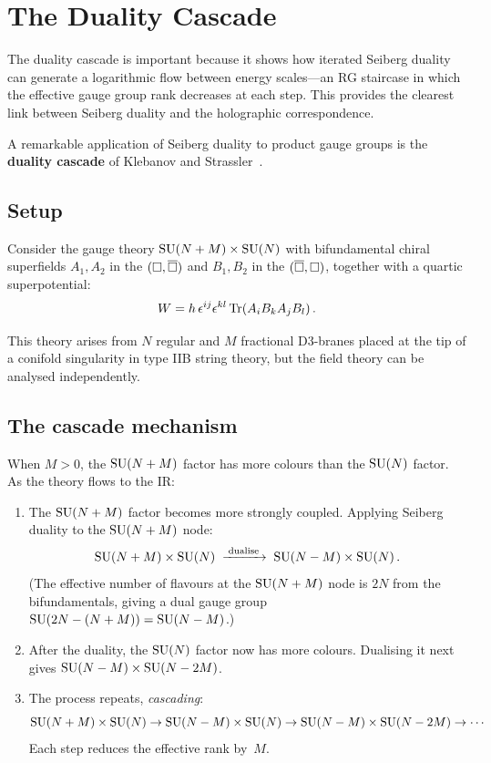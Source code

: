 \documentclass[11pt,a4paper]{article}
\begin{document}
\section{The Duality Cascade}
\label{sec:cascade}

The duality cascade is important because it shows how iterated Seiberg
duality can generate a logarithmic flow between energy scales---an RG
staircase in which the effective gauge group rank decreases at each
step.  This provides the clearest link between Seiberg duality and
the holographic correspondence.

A remarkable application of Seiberg duality to product gauge groups
is the \textbf{duality cascade} of Klebanov and
Strassler~\cite{KlebanovStrassler2000}.

\subsection{Setup}

Consider the gauge theory $\mathrm{SU}(N+M) \times \mathrm{SU}(N)$ with
bifundamental chiral superfields $A_1, A_2$ in the
$(\square, \overline{\square})$ and $B_1, B_2$ in the $(\overline{\square}, \square)$,
together with a quartic superpotential:
\[
  W = h\,\epsilon^{ij}\epsilon^{kl}\,
  \mathrm{Tr}(A_i B_k A_j B_l)\,.
\]

This theory arises from $N$ regular and $M$ fractional D3-branes
placed at the tip of a conifold singularity in type IIB string
theory, but the field theory can be analysed independently.

\subsection{The cascade mechanism}

When $M > 0$, the $\mathrm{SU}(N+M)$ factor has more colours than the
$\mathrm{SU}(N)$ factor.  As the theory flows to the IR:
\begin{enumerate}
  \item The $\mathrm{SU}(N+M)$ factor becomes more strongly coupled.
    Applying Seiberg duality to the $\mathrm{SU}(N+M)$ node:
    \[
      \mathrm{SU}(N+M) \times \mathrm{SU}(N)
      \;\xrightarrow{\;\text{dualise}\;}
      \;\mathrm{SU}(N-M) \times \mathrm{SU}(N)\,.
    \]
    (The effective number of flavours at the $\mathrm{SU}(N+M)$ node is
    $2N$ from the bifundamentals, giving a dual gauge group
    $\mathrm{SU}(2N - (N+M)) = \mathrm{SU}(N-M)$.)
  \item After the duality, the $\mathrm{SU}(N)$ factor now has more
    colours.  Dualising it next gives
    $\mathrm{SU}(N-M) \times \mathrm{SU}(N-2M)$.
  \item The process repeats, \emph{cascading}:
    \[
      \mathrm{SU}(N+M) \times \mathrm{SU}(N)
      \to \mathrm{SU}(N-M) \times \mathrm{SU}(N)
      \to \mathrm{SU}(N-M) \times \mathrm{SU}(N-2M)
      \to \cdots
    \]
    Each step reduces the effective rank by~$M$.
\end{enumerate}
\end{document}
